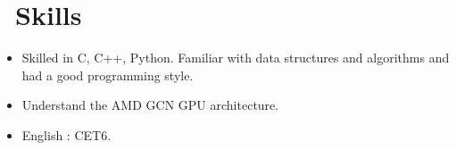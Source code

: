 \documentclass{resume}
\begin{document}
\section{\faCogs\ Skills}
\begin{itemize}[parsep=0.5ex]
  \item Skilled in C, C++, Python. Familiar with data structures and algorithms and had a good programming style.
  \item Understand the AMD GCN GPU architecture.
  \item English : CET6.
\end{itemize}
\end{document}
